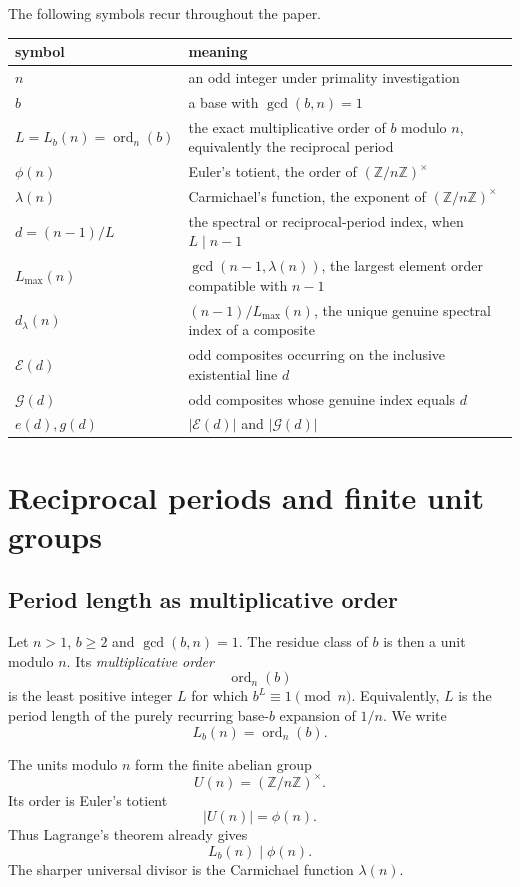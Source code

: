 \documentclass[11pt]{article}
\newcommand{\ord}{\operatorname{ord}}
\begin{document}
The following symbols recur throughout the paper.
\begin{center}
\small
\begin{tabularx}{0.94\textwidth}{@{}lX@{}}
\toprule
symbol & meaning\\
\midrule
$n$ & an odd integer under primality investigation\\
$b$ & a base with $\gcd(b,n)=1$\\
$L=L_b(n)=\ord_n(b)$ & the exact multiplicative order of $b$ modulo $n$, equivalently the reciprocal period\\
$\phi(n)$ & Euler's totient, the order of $(\mathbb Z/n\mathbb Z)^\times$\\
$\lambda(n)$ & Carmichael's function, the exponent of $(\mathbb Z/n\mathbb Z)^\times$\\
$d=(n-1)/L$ & the spectral or reciprocal-period index, when $L\mid n-1$\\
$L_{\max}(n)$ & $\gcd(n-1,\lambda(n))$, the largest element order compatible with $n-1$\\
$d_\lambda(n)$ & $(n-1)/L_{\max}(n)$, the unique genuine spectral index of a composite\\
$\mathcal E(d)$ & odd composites occurring on the inclusive existential line $d$\\
$\mathcal G(d)$ & odd composites whose genuine index equals $d$\\
$e(d),g(d)$ & $|\mathcal E(d)|$ and $|\mathcal G(d)|$\\
\bottomrule
\end{tabularx}
\end{center}

\section{Reciprocal periods and finite unit groups}
\label{sec:period-groups}

\subsection{Period length as multiplicative order}

Let $n>1$, $b\ge2$ and $\gcd(b,n)=1$.  The residue class of $b$ is then a
unit modulo $n$.  Its \emph{multiplicative order}
\[
\ord_n(b)
\]
is the least positive integer $L$ for which $b^L\equiv1\pmod n$.
Equivalently, $L$ is the period length of the purely recurring base-$b$
expansion of $1/n$.  We write
\[
L_b(n)=\ord_n(b).
\]

The units modulo $n$ form the finite abelian group
\[
U(n)=(\mathbb Z/n\mathbb Z)^\times.
\]
Its order is Euler's totient
\[
|U(n)|=\phi(n).
\]
Thus Lagrange's theorem already gives
\[
L_b(n)\mid\phi(n).
\]
The sharper universal divisor is the Carmichael function $\lambda(n)$.
\end{document}
